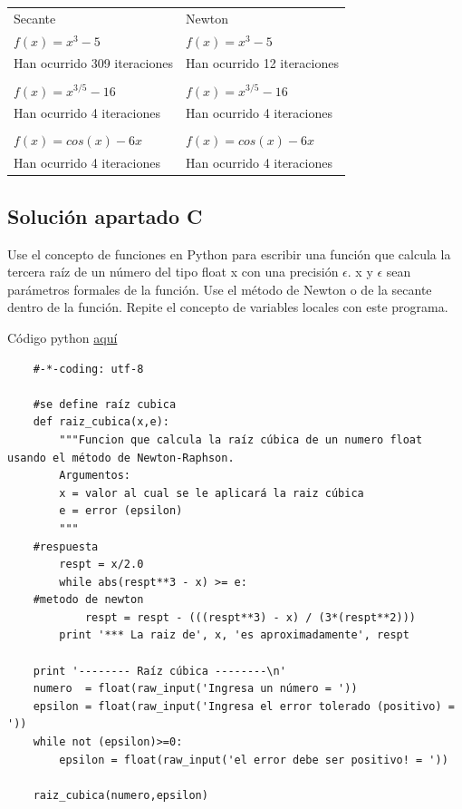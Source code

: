 \documentclass{article}
\begin{document}
\begin{table}[h]\centering
\begin{tabular}{ll}
Secante                      & Newton                      \\
$f(x) = x^3 - 5$             & $f(x) = x^3 - 5$            \\
Han ocurrido 309 iteraciones & Han ocurrido 12 iteraciones \\
                             &                             \\
$f(x) = x^{3/5}-16$          & $f(x) = x^{3/5}-16$         \\
Han ocurrido 4 iteraciones   & Han ocurrido 4 iteraciones  \\
                             &                             \\
$f(x) = cos(x) - 6x$         & $f(x) = cos(x) - 6x$        \\
Han ocurrido 4 iteraciones   & Han ocurrido 4 iteraciones 
\end{tabular}
\end{table}
\newpage 
\subsection{Solución apartado C}
Use el concepto de funciones en Python para escribir una función que calcula la tercera raíz
de un número del tipo float x con una precisión $\epsilon$. x y $\epsilon$ sean parámetros formales de la
función. Use el método de Newton o de la secante dentro de la función. Repite el concepto de variables locales con este programa.

Código python \href{https://github.com/joescalona/Programacion-Astronomica/blob/master/Tarea\%205/problema1_C.py}{aquí}
    \begin{verbatim}
    #-*-coding: utf-8

    #se define raíz cubica
    def raiz_cubica(x,e):
    	"""Funcion que calcula la raíz cúbica de un numero float usando el método de Newton-Raphson.
    	Argumentos:
    	x = valor al cual se le aplicará la raiz cúbica
    	e = error (epsilon)
    	"""
    #respuesta 
    	respt = x/2.0
    	while abs(respt**3 - x) >= e:
    #metodo de newton
    		respt = respt - (((respt**3) - x) / (3*(respt**2)))
    	print '*** La raiz de', x, 'es aproximadamente', respt
    
    print '-------- Raíz cúbica --------\n'
    numero  = float(raw_input('Ingresa un número = '))
    epsilon = float(raw_input('Ingresa el error tolerado (positivo) = '))
    while not (epsilon)>=0:
    	epsilon = float(raw_input('el error debe ser positivo! = '))
    
    raiz_cubica(numero,epsilon) 
    \end{verbatim}
\end{document}

